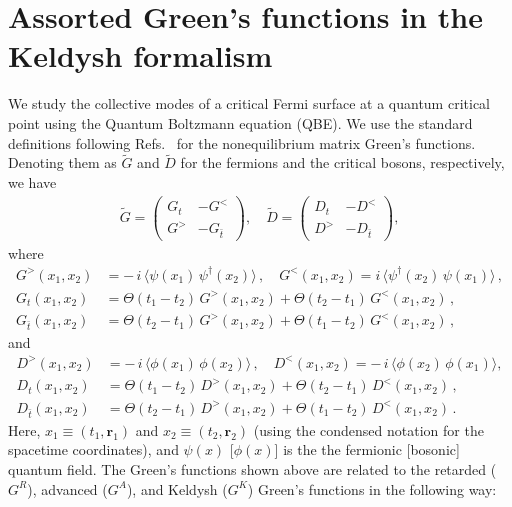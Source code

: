 \documentclass[aps, prb, onecolumn, nofootinbib, citeautoscript, 10pt]{revtex4-2}
\def \nn{\nonumber \\}
\begin{document}
	

\appendix
\section{Assorted Green’s functions in the Keldysh formalism}
\label{app1}

We study the collective modes of a critical Fermi surface at a quantum critical point using the Quantum Boltzmann equation (QBE). We use the standard definitions following Refs.~\cite{kadanoff2018quantum,mahan2013many,craig,rammer1986quantum} for the nonequilibrium matrix Green's functions. Denoting them as $\tilde{G}$ and $\tilde{D}$ for the fermions and the critical bosons, respectively, we have
\begin{align}
\tilde{G}=\begin{pmatrix}
	G_t & -G^<\\
	G^> & -G_{\bar{t}}
\end{pmatrix}, 
\quad
\tilde{D}=\begin{pmatrix}
	D_t & -D^<\\
	D^> & -D_{\bar{t}}
\end{pmatrix},
\label{eq-matrix-green}
\end{align}
where
\begin{align}
	G^>(x_1,x_2) & = -\,  i \, \langle \psi(x_1)\, \psi^\dagger(x_2) \rangle \,, \quad
	G^<(x_1,x_2) = i \, \langle \psi^\dagger(x_2)\, \psi(x_1) \rangle \,, \nn
	G_t(x_1,x_2) & = \Theta(t_1-t_2) \, G^>(x_1,x_2)  +  \Theta(t_2-t_1) \, G^<(x_1,x_2) \,,\nn
	G_{\bar{t}}(x_1,x_2) & =\Theta(t_2-t_1) \, G^>(x_1,x_2)  +  \Theta(t_1-t_2) \, G^<(x_1,x_2) \,,
\end{align}
and 
\begin{align}
	D^>(x_1,x_2) & = - \, i \, \langle \phi(x_1)\, \phi({x_2}) \rangle\,,\quad
	D^<(x_1,x_2) = - \, i \, \langle \phi(x_2)\, \phi({x_1}) \rangle, \\
	D_t(x_1,x_2) & = \Theta(t_1-t_2) \, D^>(x_1, x_2)  +
	\Theta(t_2-t_1) \, D^<(x_1,x_2) \, ,\\
	D_{\bar{t}}(x_1,x_2) & = \Theta(t_2-t_1) \, D^>(x_1,x_2)  +  \Theta(t_1-t_2) \, D^<(x_1,x_2) \,.
\end{align}
Here, $x_1 \equiv (t_1, {\mathbf r}_1)$ and $x_2 \equiv (t_2, {\mathbf r}_2)$ (using the condensed notation for the spacetime coordinates), and $\psi (x)$ [$\phi(x)$] is the the fermionic [bosonic] quantum field. The Green's functions shown above are related to the retarded ($G^R$), advanced ($G^A$), and Keldysh ($G^K$) Green's functions in the following way:
\end{document}
